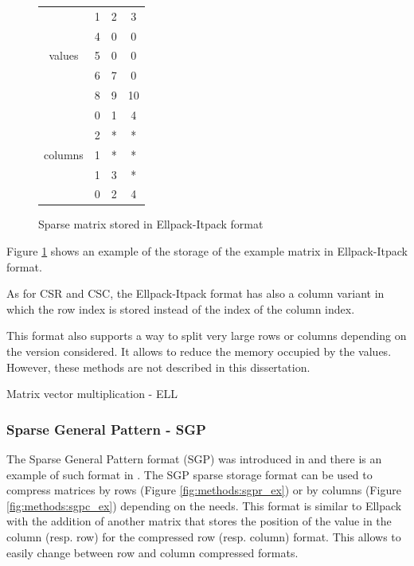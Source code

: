\begin{figure}[h]
\centering
\begin{tabular}{c|ccc|}
	\cline{2-4}
	\multirow{5}{*}{values}  & 1 & 2 & 3  \\
	                         & 4 & 0 & 0  \\
	                         & 5 & 0 & 0  \\
	                         & 6 & 7 & 0  \\
	                         & 8 & 9 & 10 \\ \cline{2-4}
	\multirow{5}{*}{columns} & 0 & 1 & 4  \\
	                         & 2 & * & *  \\
	                         & 1 & * & *  \\
	                         & 1 & 3 & *  \\
	                         & 0 & 2 & 4  \\ \cline{2-4}
\end{tabular}
\caption{Sparse matrix stored in Ellpack-Itpack format \label{fig:methods:ell_ex}}
\end{figure}

Figure \ref{fig:methods:ell_ex} shows an example of the storage of the example matrix in Ellpack-Itpack format.

As for CSR and CSC, the Ellpack-Itpack format has also a column variant in which the row index is stored instead of the index of the column index.

This format also supports a way to split very large rows or columns depending on the version considered.
It allows to reduce the memory occupied by the values.
However, these methods are not described in this dissertation.

\begin{algorithm}[h]
	\DontPrintSemicolon
	\caption{Matrix vector multiplication - ELL\label{fig:methods:ell_algo}}
\end{algorithm}

\subsubsection{Sparse General Pattern - SGP}
The Sparse General Pattern format (SGP) was introduced in \cite{Petit1991} and there is an example of such format in \cite{PetiE1996}.
The SGP sparse storage format can be used to compress matrices by rows (Figure \ref{fig:methods:sgpr_ex}) or by columns (Figure \ref{fig:methods:sgpc_ex}) depending on the needs.
This format is similar to Ellpack with the addition of another matrix that stores the position of the value in the column (resp. row) for the compressed row (resp. column) format.
This allows to easily change between row and column compressed formats.


